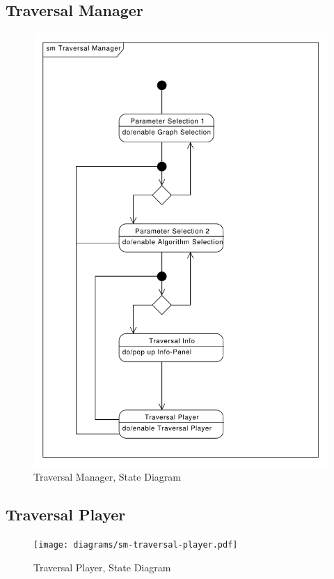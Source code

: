 \subsection{Traversal Manager}
\begin{figure}[H]
    \centering
    \includegraphics[scale=0.5]{diagrams/sm-traversal-manager.pdf}
    \caption{Traversal Manager, State Diagram}
    \label{fig:sm-traversal-manager}
\end{figure}
% 
\subsection{Traversal Player}
\begin{figure}[H]
    \centering
    \texttt{[image: diagrams/sm-traversal-player.pdf]}
    \caption{Traversal Player, State Diagram}
    \label{fig:sm-traversal-player}
\end{figure}